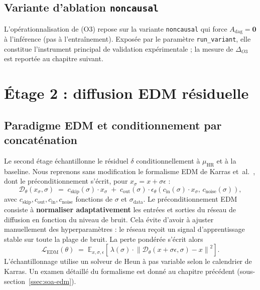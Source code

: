 \documentclass[14pt,a4paper,openany]{extreport}
\theoremstyle{definition}
\newcommand{\HR}{\ensuremath{\text{HR}}}
\newcommand{\muHR}{\ensuremath{\mu_{\HR}}}
\newcommand{\Adag}{\ensuremath{A_{\mathrm{dag}}}}
\newcommand{\LEDM}{\ensuremath{\mathcal{L}_{\mathrm{EDM}}}}
\begin{document}
\subsection{Variante d'ablation \texttt{noncausal}}
\label{ssec:oracle-noncausal}

L'opérationnalisation de (O3) repose sur la variante \texttt{noncausal} qui force $\Adag = \mathbf{0}$ à l'inférence (pas à l'entraînement). Exposée par le paramètre \texttt{run\_variant}, elle constitue l'instrument principal de validation expérimentale ; la mesure de $\Delta_{O3}$ est reportée au chapitre suivant.

\section{Étage 2 : diffusion EDM résiduelle}
\label{sec:oracle-edm}

\subsection{Paradigme EDM et conditionnement par concaténation}
\label{ssec:oracle-edm-choix}

Le second étage échantillonne le résiduel $\delta$ conditionnellement à $\muHR$ et à la baseline. Nous reprenons sans modification le formalisme EDM de Karras et~al.~\cite{karras_edm_2022}, dont le préconditionnement s'écrit, pour $x_\sigma = x + \sigma \epsilon$ :
\begin{equation}
  \mathcal{D}_\theta(x_\sigma, \sigma) \;=\; c_{\mathrm{skip}}(\sigma) \cdot x_\sigma \;+\; c_{\mathrm{out}}(\sigma) \cdot \epsilon_\theta\!\left( c_{\mathrm{in}}(\sigma) \cdot x_\sigma,\, c_{\mathrm{noise}}(\sigma) \right),
  \label{eq:edm-precond}
\end{equation}
avec $c_{\mathrm{skip}}, c_{\mathrm{out}}, c_{\mathrm{in}}, c_{\mathrm{noise}}$ fonctions de $\sigma$ et $\sigma_{\mathrm{data}}$. Le préconditionnement EDM consiste à \textbf{normaliser adaptativement} les entrées et sorties du réseau de diffusion en fonction du niveau de bruit. Cela évite d'avoir à ajuster manuellement des hyperparamètres : le réseau reçoit un signal d'apprentissage stable sur toute la plage de bruit. La perte pondérée s'écrit alors
\begin{equation}
  \LEDM(\theta) \;=\; \mathbb{E}_{x, \sigma, \epsilon}\!\left[\, \lambda(\sigma) \cdot \left\| \mathcal{D}_\theta\!\left( x + \sigma \epsilon, \sigma \right) - x \right\|^2 \right].
  \label{eq:edm-loss}
\end{equation}
L'échantillonnage utilise un solveur de Heun à pas variable selon le calendrier de Karras. Un examen détaillé du formalisme est donné au chapitre précédent (sous-section~\ref{ssec:soa-edm}).
\end{document}
